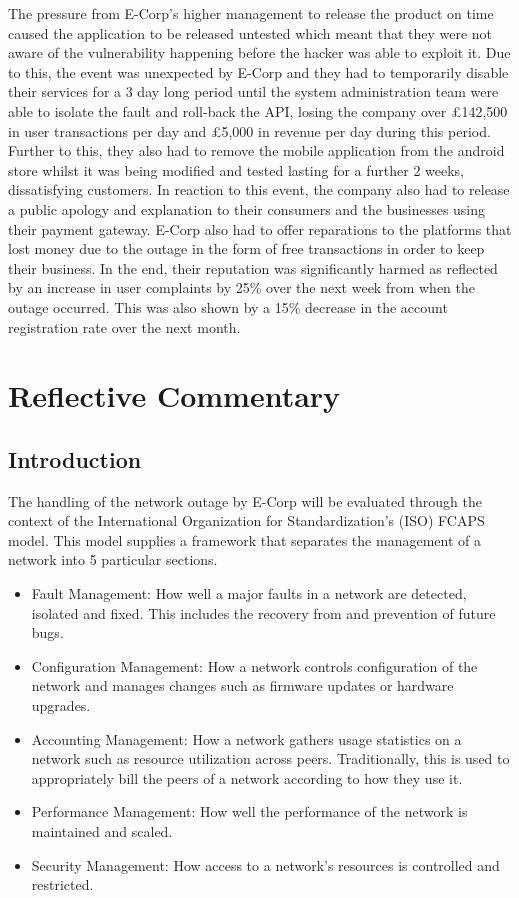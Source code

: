 \documentclass[]{report}
\begin{document}
The pressure from E-Corp's higher management to release the product on time caused the application to be released untested which meant that they were not aware of the vulnerability happening before the hacker was able to exploit it. Due to this, the event was unexpected by E-Corp and they had to temporarily disable their services for a 3 day long period until the system administration team were able to isolate the fault and roll-back the API, losing the company over £142,500 in user transactions per day and £5,000 in revenue per day during this period. Further to this, they also had to remove the mobile application from the android store whilst it was being modified and tested lasting for a further 2 weeks, dissatisfying customers. In reaction to this event, the company also had to release a public apology and explanation to their consumers and the businesses using their payment gateway. E-Corp also had to offer reparations to the platforms that lost money due to the outage in the form of free transactions in order to keep their business. In the end, their reputation was significantly harmed as reflected by an increase in user complaints by 25\% over the next week from when the outage occurred. This was also shown by a 15\% decrease in the account registration rate over the next month. 

\chapter{Reflective Commentary}

\section{Introduction}
The handling of the network outage by E-Corp will be evaluated through the context of the International Organization for Standardization's (ISO) FCAPS model. This model supplies a framework that separates the management of a network into 5 particular sections.

\begin{itemize}
	\item Fault Management:
	How well a major faults in a network are detected, isolated and fixed. This includes the recovery from and prevention of future bugs. 
	\item Configuration Management:
	How a network controls configuration of the network and manages changes such as firmware updates or hardware upgrades.
	\item Accounting Management:
	How a network gathers usage statistics on a network such as resource utilization across peers. Traditionally, this is used to appropriately bill the peers of a network according to how they use it.
	\item Performance Management:
	How well the performance of the network is maintained and scaled.
	\item Security Management:
	How access to a network's resources is controlled and restricted.
\end{itemize}
\end{document}
